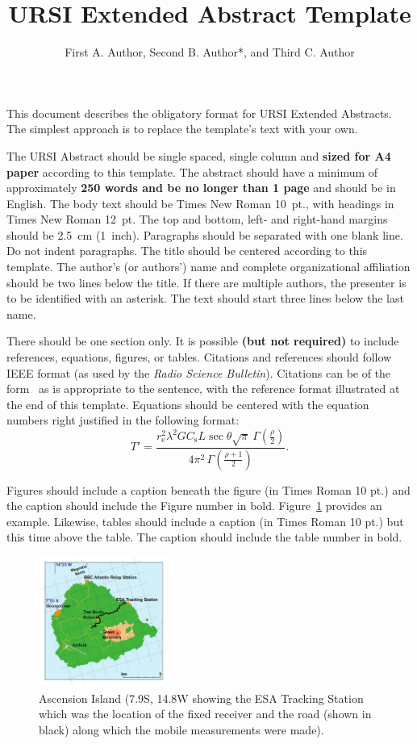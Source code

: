 \documentclass[abstract]{ursi}
\title{URSI Extended Abstract Template}
\author{First A. Author\affref{ref1}, Second B. Author*\affref{ref1},
  and Third C. Author\affref{ref2}}
\affiliation{%
  \aff{ref1}{ABC University, Prague, Czechia; e-mail: FAA@seznam.cz; SBA@email.cz}
  \aff{ref2}{The Next University, Neverland, USA; e-mail: TCA@gmail.com}
}
\begin{document}
\maketitle

This document describes the obligatory format for URSI Extended Abstracts. The simplest approach is to replace the template’s text with your own. 

The URSI Abstract should be single spaced, single column and \textbf{sized
  for A4 paper} according to this template. The abstract should have a minimum
of approximately \textbf{250 words and be no longer than 1 page} and should be in
English.
%
The body text should be Times New Roman 10~pt., with headings in Times New
Roman 12~pt. The top and bottom, left- and right-hand margins should be
2.5~cm (1~inch). Paragraphs should be separated with one blank line. Do not
indent paragraphs.
%
The title should be centered according to this template. The author's (or
authors') name and complete organizational affiliation should be two lines
below the title. If there are multiple authors, the presenter is to be
identified with an asterisk. The text should start three lines below the
last name.

There should be one section only. It is possible \textbf{(but not required)} to include references, equations, figures, or tables.  Citations and references should follow IEEE format (as used by the 
\emph{Radio Science Bulletin}).  Citations can be of the
form~\cite{cannon,mannix} as is appropriate to the sentence, with the
reference format illustrated at the end of this template.
Equations should be centered with the equation numbers right justified in
the following format:
\begin{equation}
  \label{eq:T}
  T' = \frac{r_\text{e}^2\lambda^2GC_\text{s}L
    \sec\theta\sqrt{\pi}\ \Gamma\!\left(\frac\rho2\right)}
  {4\pi^2\,\Gamma\!\left(\frac{\rho+1}{2}\right)}.
\end{equation}

Figures should include a caption beneath the figure (in Times Roman 10 pt.)
and the caption should include the Figure number in
bold. Figure~\ref{fig:asc} provides an example.
Likewise, tables should include a caption (in Times Roman 10 pt.) but this
time above the table. The caption should include the table number in bold.

\begin{figure}[htbp]
  \centering
  \includegraphics[width=42mm]{ascension_island}
  \caption{Ascension Island (7.9\textdegree S, 14.8\textdegree W showing
    the ESA Tracking Station which was the location of the fixed receiver
    and the road (shown in black) along which the mobile measurements were
    made).}
  \label{fig:asc}
\end{figure}
\end{document}
